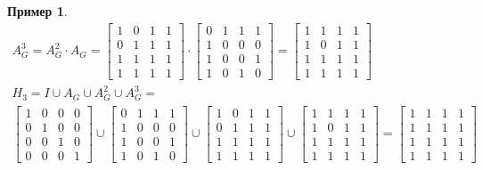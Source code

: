 \documentclass[fleqn, 12pt]{article}
\theoremstyle{definition}
\newtheorem{example}{Пример}[subsection]
\begin{document}
\begin{example}
\begin{gather*}
A_G ^3 = A_G ^2 \cdot A_G = 
\begin{bmatrix}
1& 0 & 1 & 1 \\
0 & 1 & 1 & 1 \\
1 & 1 & 1 & 1\\
1 & 1 & 1 & 1
\end{bmatrix} 
\cdot 
\begin{bmatrix}
0& 1 & 1 & 1 \\
1 & 0 & 0 & 0 \\
1 & 0 & 0 & 1\\
1 & 0 & 1 & 0
\end{bmatrix} 
= 
\begin{bmatrix}
1& 1 & 1 & 1 \\
1 & 0 & 1 & 1 \\
1 & 1 & 1 & 1\\
1 & 1 & 1 & 1
\end{bmatrix} 
\\
H_3 = I \cup A_G \cup A_G^2 \cup A_G^3 = \\
\begin{bmatrix}
1 & 0 & 0 & 0 \\
0 & 1 & 0 & 0 \\
0 & 0 & 1 & 0\\
0 & 0 & 0 & 1
\end{bmatrix} 
\cup
\begin{bmatrix}
0& 1 & 1 & 1 \\
1 & 0 & 0 & 0 \\
1 & 0 & 0 & 1\\
1 & 0 & 1 & 0
\end{bmatrix} 
\cup
\begin{bmatrix}
1& 0 & 1 & 1 \\
0 & 1 & 1 & 1 \\
1 & 1 & 1 & 1\\
1 & 1 & 1 & 1
\end{bmatrix} 
\cup
\begin{bmatrix}
1& 1 & 1 & 1 \\
1 & 0 & 1 & 1 \\
1 & 1 & 1 & 1\\
1 & 1 & 1 & 1
\end{bmatrix} 
= 
\begin{bmatrix}
1& 1 & 1 & 1 \\
1 & 1 & 1 & 1 \\
1 & 1 & 1 & 1\\
1 & 1 & 1 & 1
\end{bmatrix} 
\end{gather*}
\end{example}
\end{document}

